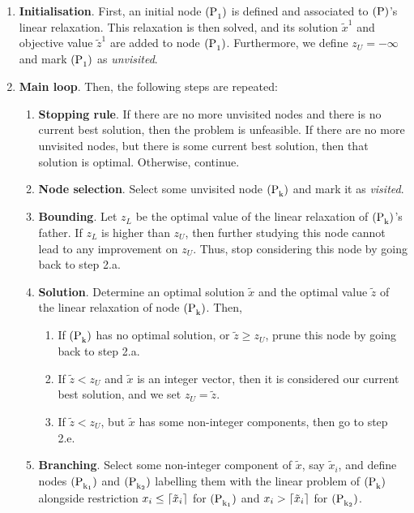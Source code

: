 \newcommand{\pprob}[1]{$\rm{(P}_{#1}\rm{)}$}
\begin{enumerate}
    \item \textbf{Initialisation}.
	First, an initial node \pprob{1} is defined and associated to
	$\rm{(P)}$'s linear relaxation. This relaxation is then solved, and its
	solution $\tilde{x}^1$ and objective value $\tilde{z}^1$ are added to
	node \pprob{1}. Furthermore, we define $z_U = -\infty$ and mark
	\pprob{1} as \emph{unvisited}.
    \item \textbf{Main loop}.
        Then, the following steps are repeated:
        \begin{enumerate}
            \item \textbf{Stopping rule}.
		If there are no more unvisited nodes and there is no current
		best solution, then the problem is unfeasible. If there are no
		more unvisited nodes, but there is some current best solution,
		then that solution is optimal.  Otherwise, continue.
	    \item \textbf{Node selection}.
		Select some unvisited node \pprob{k} and mark it as
		\emph{visited}.
            \item \textbf{Bounding}.
		Let $z_L$ be the optimal value of the linear relaxation of
		\pprob{k}'s father. If $z_L$ is higher than $z_U$, then further
		studying this node cannot lead to any improvement on $z_U$.
		Thus, stop considering this node by going back to step 2.a.
            \item \textbf{Solution}.
		Determine an optimal solution $\tilde{x}$ and the optimal value
		$\tilde{z}$ of the linear relaxation of node \pprob{k}. Then,
		\begin{enumerate}
    		    \item
			If \pprob{k} has no optimal solution, or $\tilde{z} \geq
			z_U$, prune this node by going back to step 2.a.
		    \item
			If $\tilde{z} < z_U$ and $\tilde{x}$ is an integer
			vector, then it is considered our current best solution,
			and we set $z_U = \tilde{z}$.
		    \item
			If $\tilde{z} < z_U$, but $\tilde{x}$ has some
			non-integer components, then go to step 2.e.
		\end{enumerate}
	    \item \textbf{Branching}.
		Select some non-integer component of $\tilde{x}$, say
		$\tilde{x}_i$, and define nodes \pprob{k_1} and \pprob{k_2}
		labelling them with the linear problem of \pprob{k} alongside
		restriction $x_i \leq {\lceil {\tilde{x}_i} \rceil}$ for \pprob{k_1} and
		$x_i > {\lceil {\tilde{x}_i} \rceil}$ for \pprob{k_2}.
        \end{enumerate}
\end{enumerate}

